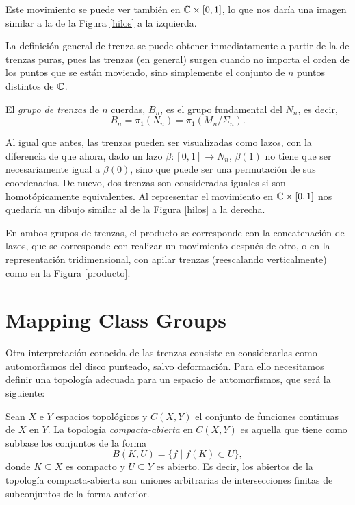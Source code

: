 \documentclass[TFG.tex]{subfiles}
\begin{document}
Este movimiento se puede ver también en $\mathbb{C}\times[0,1]$, lo que nos daría una imagen similar a la de la Figura \ref{hilos} a la izquierda.

La definición general de trenza se puede obtener inmediatamente a partir de la de trenzas puras, pues las trenzas (en general) surgen cuando no importa el orden de los puntos que se están moviendo, sino simplemente el conjunto de $n$ puntos distintos de $\mathbb{C}$.

\begin{defi}
El \emph{grupo de trenzas} de $n$ cuerdas, $B_n$,  es el grupo fundamental del $N_n$, es decir,
$$B_n=\pi_1(N_n)=\pi_1(M_n/\Sigma_n).$$
\end{defi}

Al igual que antes, las trenzas pueden ser visualizadas como lazos, con la diferencia de que ahora, dado un lazo $\beta:[0,1]\to N_n$, $\beta(1)$ no tiene que ser necesariamente igual a $\beta(0)$, sino que puede ser una permutación de sus coordenadas. De nuevo, dos trenzas son consideradas iguales si son homotópicamente equivalentes. Al representar el movimiento en $\mathbb{C}\times[0,1]$ nos quedaría un dibujo similar al de la Figura \ref{hilos} a la derecha.

En ambos grupos de trenzas, el producto se corresponde con la concatenación de lazos, que se corresponde con realizar un movimiento después de otro, o en la representación tridimensional, con apilar trenzas (reescalando verticalmente) como en la Figura \ref{producto}. 




\section{Mapping Class Groups}

Otra interpretación conocida de las trenzas consiste en considerarlas como automorfismos del disco punteado, salvo deformación. Para ello necesitamos definir una topología adecuada para un espacio de automorfismos, que será la siguiente:

\begin{defi}
Sean $X$ e $Y$ espacios topológicos y $C(X,Y)$ el conjunto de funciones continuas de $X$ en $Y$. La topología \emph{compacta-abierta} en $C(X,Y)$ es aquella que tiene como subbase los conjuntos de la forma
$$B(K,U)=\{f\mid f(K)\subset U\},$$
donde $K\subseteq X$ es compacto y $U\subseteq Y$ es abierto. Es decir, los abiertos de la topología compacta-abierta son uniones arbitrarias de intersecciones finitas de subconjuntos de la forma anterior.
\end{defi}
\end{document}
